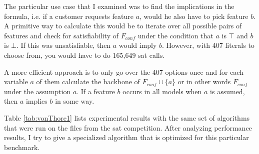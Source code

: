 The particular use case that I examined was to find the implications in the formula, i.e. if a customer requests feature $a$, would he also have to pick feature $b$. A primitive way to calculate this would be to iterate over all possible pairs of features 
and check for satisfiability of $F_{conf}$ under the condition that $a$ is $\top$ and $b$ is $\bot$. If this was unsatisfiable, then $a$ would imply $b$. However, with 407 literals to choose from, you would have to do 165,649 sat calls. 

A more efficient approach is to only go over the 407 options once and for each variable $a$ of them calculate the backbone of $F_{conf} \cup \{a\}$ or in other words $F_{conf}$ under the assumption $a$. If a feature $b$ occurs in all models when $a$ is assumed, then $a$ implies $b$ in some way.

Table \ref{tab:vonThore1} lists experimental results with the same set of algorithms that were run on the files from the sat competition. After analyzing performance results, I try to give a specialized algorithm that is optimized for this particular benchmark.


